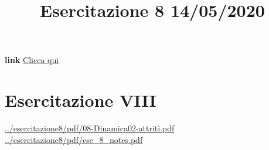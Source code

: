 \title{Esercitazione 8 14/05/2020}\newline
\textbf{link} \href{https://web.microsoftstream.com/video/e3c9907a-9d22-4c80-9ea7-4881d9913a5d}{Clicca qui}
\section{Esercitazione VIII}
\url{../esercitazione8/pdf/08-Dinamica02-attriti.pdf}\newline
\url{../esercitazione8/pdf/ese_8_notes.pdf}
